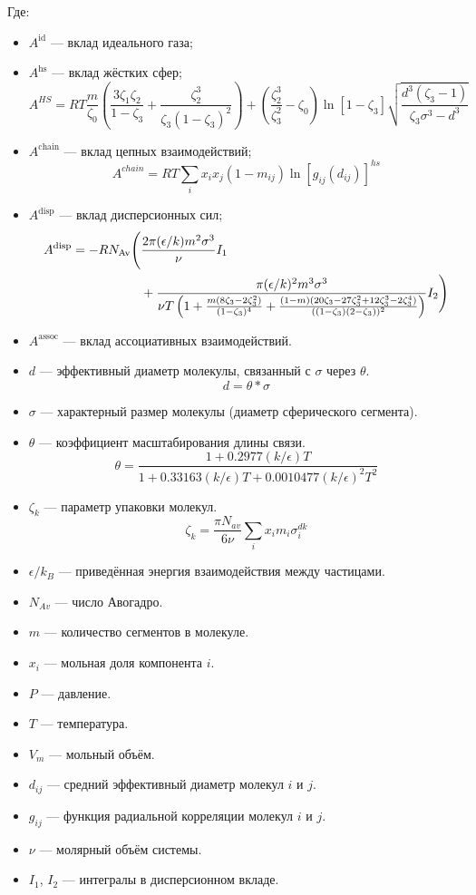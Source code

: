 \documentclass[a4paper,12pt]{article}
\begin{document}
Где:
\begin{itemize}
    \item \( A^{\text{id}} \) — вклад идеального газа;
    \item \( A^{\text{hs}} \) — вклад жёстких сфер;
      \[
      A^{HS} = RT \frac{m}{\zeta_0} \left( \frac{3 \zeta_1 \zeta_2}{1 - \zeta_3} + \frac{\zeta_2^3}{\zeta_3 (1 - \zeta_3)^2} \right) + \left( \frac{\zeta_2^3}{\zeta_3^2} - \zeta_0 \right) \ln [1 - \zeta_3] \sqrt{\frac{d^3 (\zeta_3 - 1)}{\zeta_3 \sigma^3 - d^3}}
      \]
    \item \( A^{\text{chain}} \) — вклад цепных взаимодействий;
      \[
      A^{chain} = RT \sum_i x_i x_j (1 - m_{ij}) \ln [g_{ij} (d_{ij})]^{hs}
      \]
    \item \( A^{\text{disp}} \) — вклад дисперсионных сил;
      \begin{align}
      A^{\text{disp}} = -RN_{\text{Av}} \Bigg( & \frac{2 \pi (\epsilon / k) m^2 \sigma^3}{\nu} I_1 \notag \\
      & + \frac{\pi (\epsilon / k)^2 m^3 \sigma^3}{\nu T \left(
      1 + \frac{m (8 \zeta_3 - 2 \zeta_3^2)}{(1 - \zeta_3)^4} +
      \frac{(1 - m)(20 \zeta_3 - 27 \zeta_3^2 + 12 \zeta_3^3 - 2 \zeta_3^4)}{((1 - \zeta_3)(2 - \zeta_3))^2}
      \right)} I_2 \Bigg)
      \end{align}

    \item \( A^{\text{assoc}} \) — вклад ассоциативных взаимодействий.
    \item $d$ — эффективный диаметр молекулы, связанный с $\sigma$ через $\theta$.
      \[
        d = \theta * \sigma
      \]
    \item $\sigma$ — характерный размер молекулы (диаметр сферического сегмента).
    \item $\theta$ — коэффициент масштабирования длины связи.
      \[
      \theta = \frac{1 + 0.2977 (k / \epsilon) T}{1 + 0.33163 (k / \epsilon) T + 0.0010477 (k / \epsilon)^2 T^2}
      \]
    \item $\zeta_k$ — параметр упаковки молекул.
      \[
      \zeta_k = \frac{\pi N_{av}}{6 \nu} \sum_i x_i m_i \sigma_i^{dk}
      \]
    \item $\epsilon / k_B$ — приведённая энергия взаимодействия между частицами.
    \item $N_{Av}$ — число Авогадро.
    \item $m$ — количество сегментов в молекуле.
    \item $x_i$ — мольная доля компонента $i$.
    \item $P$ — давление.
    \item $T$ — температура.
    \item $V_m$ — мольный объём.
    \item $d_{ij}$ — средний эффективный диаметр молекул $i$ и $j$.
    \item $g_{ij}$ — функция радиальной корреляции молекул $i$ и $j$.
    \item $\nu$ — молярный объём системы.
    \item $I_1$, $I_2$ — интегралы в дисперсионном вкладе.

\end{itemize}
\end{document}
